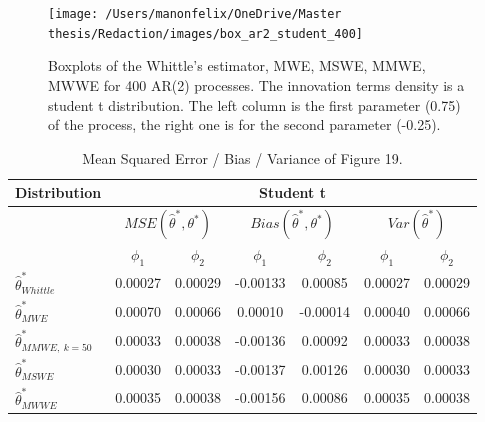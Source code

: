 \documentclass[
  11pt,
]{article}
\begin{document}
\begin{figure}

{\centering \texttt{[image: /Users/manonfelix/OneDrive/Master thesis/Redaction/images/box\_ar2\_student\_400]} 

}

\caption{Boxplots of the Whittle's estimator, MWE, MSWE, MMWE, MWWE for 400 AR(2) processes. The innovation terms density is a student t distribution. The left column is the first parameter (0.75) of the process, the right one is for the second parameter (-0.25).}\label{fig:ar2_student}
\end{figure}

\begin{table}[h]
\centering
\begin{tabular}{|l|c|c|c|c|c|c|}
\hline
\multicolumn{1}{|c|}{\textbf{Distribution}} & \multicolumn{6}{c|}{\textbf{Student t}}                                                                                                                          \\ \hline
\textbf{}                                   & \multicolumn{2}{c|}{$MSE(\hat \theta^*, \theta^*)$} & \multicolumn{2}{c|}{$Bias(\hat \theta^*, \theta^*)$} & \multicolumn{2}{c|}{$Var(\hat \theta^*)$} \\ \hline
                                            & $\phi_1$                 & $\phi_2$                 & $\phi_1$                  & $\phi_2$                 & $\phi_1$                 & $\phi_2$                 \\ \hline
$\hat \theta^*_{Whittle}$                   & 0.00027                  & 0.00029                  & -0.00133                  & 0.00085                  & 0.00027                  & 0.00029                  \\ \hline
$\hat \theta^*_{MWE}$                       & 0.00070                  & 0.00066                  & 0.00010                   & -0.00014                 & 0.00040                  & 0.00066                  \\ \hline
$\hat \theta^*_{MMWE, \ k = 50}$            & 0.00033                  & 0.00038                  & -0.00136                  & 0.00092                  & 0.00033                  & 0.00038                  \\ \hline
$\hat \theta^*_{MSWE}$                      & 0.00030                  & 0.00033                  & -0.00137                  & 0.00126                  & 0.00030                  & 0.00033                  \\ \hline
$\hat \theta^*_{MWWE}$                      & 0.00035                  & 0.00038                  & -0.00156                  & 0.00086                  & 0.00035                  & 0.00038                  \\ \hline
\end{tabular}
\caption{Mean Squared Error / Bias / Variance of Figure 19.}
\label{tab:AR2_student_table}
\end{table}
\end{document}
